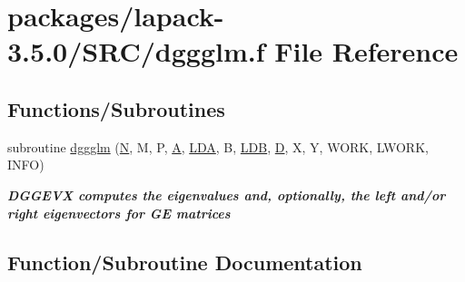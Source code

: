 \hypertarget{dggglm_8f}{}\section{packages/lapack-\/3.5.0/\+S\+R\+C/dggglm.f File Reference}
\label{dggglm_8f}
\subsection*{Functions/\+Subroutines}
\begin{DoxyCompactItemize}
\item 
subroutine \hyperlink{dggglm_8f_aa7c4f7b52f415b808e935845f19300ed}{dggglm} (\hyperlink{polmisc_8c_a0240ac851181b84ac374872dc5434ee4}{N}, M, P, \hyperlink{classA}{A}, \hyperlink{example__user_8c_ae946da542ce0db94dced19b2ecefd1aa}{L\+D\+A}, B, \hyperlink{example__user_8c_a50e90a7104df172b5a89a06c47fcca04}{L\+D\+B}, \hyperlink{odrpack_8h_a7dae6ea403d00f3687f24a874e67d139}{D}, X, Y, W\+O\+R\+K, L\+W\+O\+R\+K, I\+N\+F\+O)
\begin{DoxyCompactList}\small\item\em {\bfseries  D\+G\+G\+E\+V\+X computes the eigenvalues and, optionally, the left and/or right eigenvectors for G\+E matrices} \end{DoxyCompactList}\end{DoxyCompactItemize}


\subsection{Function/\+Subroutine Documentation}
\hypertarget{dggglm_8f_aa7c4f7b52f415b808e935845f19300ed}{}
